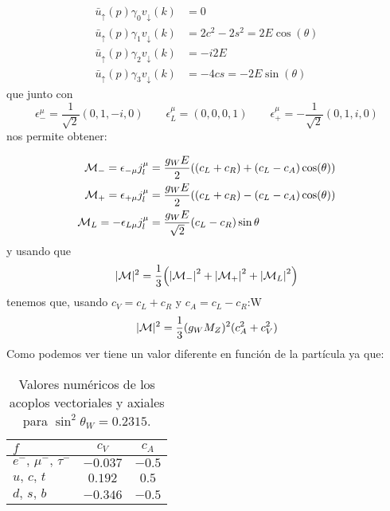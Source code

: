 \begin{align*}
    \bar{u}_\uparrow (p) \gamma_0 {v}_\downarrow (k) & = 0 \\
    \bar{u}_\uparrow (p) \gamma_1 {v}_\downarrow (k) & = 2c^2-2s^2 = 2E\cos (\theta) \\
    \bar{u}_\uparrow (p) \gamma_2 {v}_\downarrow (k) & = - i 2 E \\
    \bar{u}_\uparrow (p) \gamma_3 {v}_\downarrow (k) & = - 4 c s = -2E \sin (\theta)  
\end{align*}
que junto con
\begin{equation}
	\epsilon_- ^\mu = \frac{1}{\sqrt{2}} (0,1,-i,0) \qquad \epsilon_L^\mu = (0,0,0,1) \qquad \epsilon_+^\mu = - \frac{1}{\sqrt{2}} (0,1,i,0)
\end{equation}
nos permite obtener: 

\begin{align}
	\mathcal{M}_{-} = \epsilon_{-\mu}j_{l}^{\mu} & = \frac{g_WE}{2} ((c_L+c_R)+(c_L-c_A)\cos (\theta))  \\
	\mathcal{M}_{+} = \epsilon_{+\mu}j_{l}^{\mu} & = \frac{g_WE}{2} ((c_L+c_R)-(c_L-c_A)\cos (\theta))   \\
	\mathcal{M}_{L} = -\epsilon_{L\mu}j_{l}^{\mu} & = \frac{g_WE}{\sqrt{2}} (c_L-c_R)  \sin \theta
\end{align}
y usando que 
\begin{equation}
	|\Mcal|^2 = \frac{1}{3}\pqty{\vqty{\Mcal_{-}}^2 + \vqty{\Mcal_{+}}^2 + \vqty{\Mcal_{L}}^2}
\end{equation}
tenemos que, usando $c_V=c_L+c_R$ y $c_A=c_L-c_R$:W
\begin{equation}
	|\mathcal{M}|^2 = \frac{1}{3} (g_W M_Z)^2 (c_A^2 + c_V^2)
\end{equation}
Como podemos ver tiene un valor diferente en función de la partícula ya que:


\begin{table}[H]
\centering
\begin{tabular}{lcc}
\toprule
$f$ & $c_V$ & $c_A$ \\ 
\midrule
$e^-,\, \mu^-,\, \tau^-$ & $-0.037$ & $-0.5$ \\
$u,\, c,\, t$ & $0.192$ & $0.5$ \\
$d,\, s,\, b$ & $-0.346$ & $-0.5$ \\
\bottomrule
\end{tabular}
\caption{Valores numéricos de los acoplos vectoriales y axiales para $\sin^2\theta_W = 0.2315$.}
\label{tab:coeficientes_weak_num}
\end{table}

